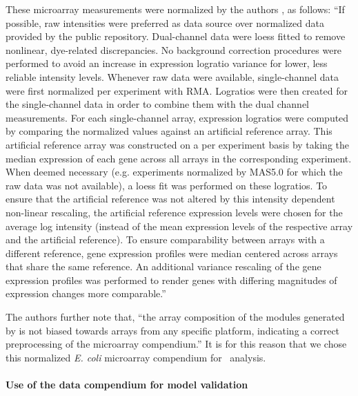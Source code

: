 
These microarray measurements were normalized by the
authors \cite{Lemmens2009a}, as follows: ``If possible, raw
intensities were preferred as data source over normalized data
provided by the public repository. Dual-channel data were loess fitted
to remove nonlinear, dye-related discrepancies. No background
correction procedures were performed to avoid an increase in
expression logratio variance for lower, less reliable intensity
levels. Whenever raw data were available, single-channel data were
first normalized per experiment with RMA. Logratios were then
created for the single-channel data in order to combine them with the
dual channel measurements. For each single-channel array, expression
logratios were computed by comparing the normalized values against an
artificial reference array.  This artificial reference array was
constructed on a per experiment basis by taking the median expression
of each gene across all arrays in the corresponding experiment. When
deemed necessary (e.g. experiments normalized by MAS5.0 for which the
raw data was not available), a loess fit was performed on these
logratios. To ensure that the artificial reference was not altered by
this intensity dependent non-linear rescaling, the artificial
reference expression levels were chosen for the average log intensity
(instead of the mean expression levels of the respective array and the
artificial reference). To ensure comparability between arrays with a
different reference, gene expression profiles were median centered
across arrays that share the same reference. An additional variance
rescaling of the gene expression profiles was performed to render
genes with differing magnitudes of expression changes more
comparable.''

The authors further note that, ``the array composition of the modules
generated by  is not biased towards arrays from any
specific platform, indicating a correct preprocessing of the
microarray compendium.'' \cite{Lemmens2009a} It is for this reason
that we chose this normalized {\it E. coli} microarray compendium
for \egrine~analysis.

\paragraph{Use of the  data compendium for model validation}
\label{section:dream5_data_compendium}

